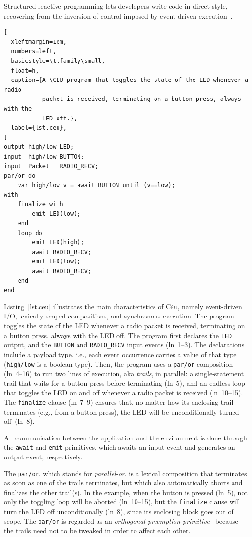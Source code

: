 \documentclass[sigplan,10pt,review,anonymous]{acmart}\settopmatter{printfolios=true,printccs=false,printacmref=false}
\newcommand{\CEU}{\textsc{C\'{e}u}\xspace}
\newcommand{\code}[1] {{\small{\texttt{#1}}}}
\begin{document}
Structured reactive programming lets developers write code in direct style,
recovering from the inversion of control imposed by event-driven
execution~\cite{rp.deprecating,rp.rescala,sync_async.cooperative}.

\begin{lstlisting}[
  xleftmargin=1em,
  numbers=left,
  basicstyle=\ttfamily\small,
  float=h,
  caption={A \CEU program that toggles the state of the LED whenever a radio
           packet is received, terminating on a button press, always with the
           LED off.},
  label={lst.ceu},
]
output high/low LED;
input  high/low BUTTON;
input  Packet   RADIO_RECV;
par/or do
    var high/low v = await BUTTON until (v==low);
with
    finalize with
        emit LED(low);
    end
    loop do
        emit LED(high);
        await RADIO_RECV;
        emit LED(low);
        await RADIO_RECV;
    end
end
\end{lstlisting}

Listing~\ref{lst.ceu} illustrates the main characteristics of \CEU, namely
event-driven I/O, lexically-scoped compositions, and synchronous execution.
%
The program toggles the state of the LED whenever a radio packet is received,
terminating on a button press, always with the LED off.
%
The program first declares the \code{LED} output, and the \code{BUTTON} and
\code{RADIO\_RECV} input events (ln~1--3).
The declarations include a payload type, i.e., each event occurrence carries
a value of that type (\code{high/low} is a boolean type).
%
Then, the program uses a \code{par/or} composition (ln~4--16) to run two lines
of execution, aka \emph{trails}, in parallel:
a single-statement trail that waits for a button press before terminating
(ln~5), and an endless loop that toggles the LED on and off whenever a radio
packet is received (ln~10--15).
The \code{finalize} clause (ln~7--9) ensures that, no matter how its enclosing
trail terminates (e.g., from a button press), the LED will be unconditionally
turned off~(ln~8).

All communication between the application and the environment is done through
the \code{await} and \code{emit} primitives, which awaits an input event and
generates an output event, respectively.

The \code{par/or}, which stands for \emph{parallel-or}, is a lexical
composition that terminates as soon as one of the trails terminates, but which
also automatically aborts and finalizes the other trail(s).
%
In the example, when the button is pressed (ln~5), not only the toggling loop
will be aborted (ln~10--15), but the \code{finalize} clause will turn the LED
off unconditionally (ln~8), since its enclosing block goes out of scope.
%
The \code{par/or} is regarded as an \emph{orthogonal preemption
primitive}~\cite{esterel.preemption} because the trails need not to be tweaked
in order to affect each other.
\end{document}

